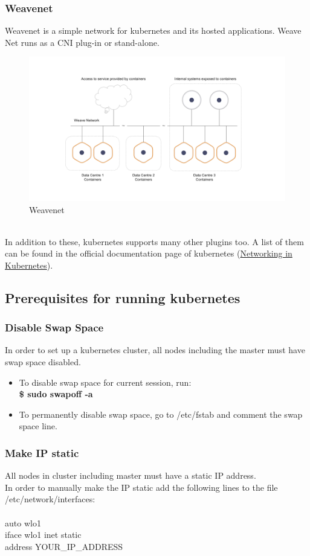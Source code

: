 \documentclass[12pt]{article}
\begin{document}
\subsubsection{Weavenet}
Weavenet is a simple network for kubernetes and its hosted applications. Weave Net runs as a CNI plug-in or stand-alone.
\begin{figure}[h!]
	\begin{center}
		\includegraphics[totalheight=0.3\textheight]{weavenet}
		\caption{Weavenet}
	\end{center}
\end{figure}
\\In addition to these, kubernetes supports many other plugins too. A list of them can be found in the official documentation page of kubernetes (\href{https://kubernetes.io/docs/concepts/cluster-administration/networking/}{Networking in Kubernetes}).
\subsection{Prerequisites for running kubernetes \cite{Prereq}}
\subsubsection{Disable Swap Space}
In order to set up a kubernetes cluster, all nodes including the master must have swap space disabled.
\begin{itemize}
	\item To disable swap space for current session, run: \\
	\textbf{\$ sudo swapoff -a}
	\item To permanently disable swap space, go to /etc/fstab and comment the swap space line.
\end{itemize}
\subsubsection{Make IP static}
All nodes in cluster including master must have a static IP address.\\
In order to manually make the IP static add the following lines to the file /etc/network/interfaces:\\\\
auto wlo1\\
iface wlo1 inet static\\
address  YOUR\_IP\_ADDRESS
\end{document}
